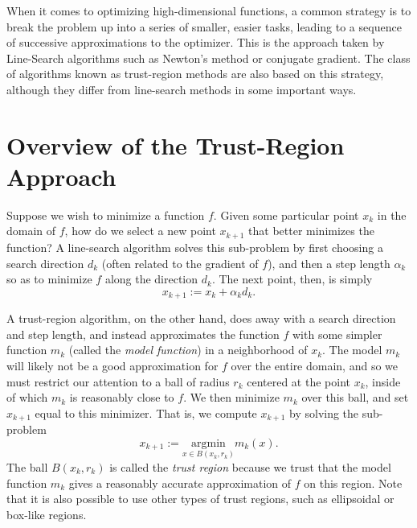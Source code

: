 \label{lab:trust_region}


When it comes to optimizing high-dimensional functions, a common strategy is to break
the problem up into a series of smaller, easier tasks, leading to a sequence of
successive approximations to the optimizer. This is the approach taken by Line-Search
algorithms such as Newton's method or conjugate gradient.
The class of algorithms known as trust-region methods are also based on this
strategy, although they differ from line-search methods in some important ways.

\section*{Overview of the Trust-Region Approach}
Suppose we wish to minimize a function $f$.
Given some particular point $x_k$ in the domain of $f$, how do we
select a new point $x_{k+1}$ that better minimizes the function? A line-search
algorithm solves this sub-problem by first choosing a search direction $d_k$
(often related to the gradient of $f$), and then a step length $\alpha_k$ so
as to minimize $f$ along the direction $d_k$. The next point, then, is simply
\[
x_{k+1} := x_k + \alpha_k d_k.
\]

A trust-region algorithm, on the other hand, does away with a search direction and
step length, and instead approximates the function $f$ with some simpler function
$m_k$ (called the \emph{model function}) in a neighborhood of $x_k$.
The model $m_k$ will likely not be a good approximation for $f$ over the entire
domain, and so we must restrict our attention to a ball of radius $r_k$ centered at
the point $x_k$, inside of which $m_k$ is reasonably close to $f$. We then minimize
$m_k$ over this ball, and set $x_{k+1}$ equal to this minimizer. That is, we compute $x_{k+1}$ by
solving the sub-problem
\[
x_{k+1} := \underset{x \in B(x_k, r_k)}{\text{argmin}} m_k(x).
\]
The ball $B(x_k, r_k)$ is called the \emph{trust region} because we trust that the
model function $m_k$ gives a reasonably accurate approximation of $f$ on this region.
Note that it is also possible to use other types of trust regions, such as
ellipsoidal or box-like regions.

